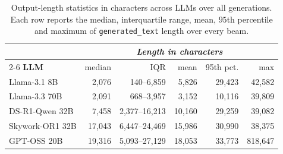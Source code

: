 \begin{table}[!htbp]
  \caption{Output-length statistics in characters across LLMs over all generations. Each row reports the median, interquartile range, mean, $95$th percentile and maximum of \texttt{generated\_text} length over every beam.}
  \label{tab:output-length-stats}
  \centering
  \footnotesize
  \begin{tabular}{@{}l r r r r r@{}}
    \toprule
    & \multicolumn{5}{c}{\textit{Length in characters}} \\
    \cmidrule(lr){2-6}
    \textbf{LLM} & median & IQR & mean & 95th pct. & max \\
    \midrule
    Llama-3.1 8B       & 2,076 & 140--6,859 & 5,826 & 29,423 & 42,582 \\
    Llama-3.3 70B      & 2,091 & 668--3,957 & 3,152 & 10,116 & 39,809 \\
    DS-R1-Qwen 32B     & 7,458 & 2,377--16,213 & 10,160 & 29,259 & 39,082 \\
    Skywork-OR1 32B    & 17,043 & 6,447--24,469 & 15,986 & 30,990 & 38,375 \\
    GPT-OSS 20B        & 19,316 & 5,093--27,129 & 18,053 & 33,773 & 818,647 \\
    \bottomrule
  \end{tabular}
\end{table}
